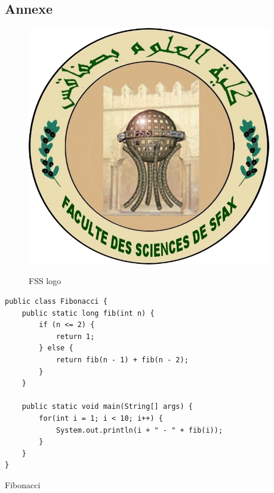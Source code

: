 \begin{appendices}
\section{Annexe}
\pagebreak

\begin{figure}[H]
    \centering
    \caption{FSS logo}
    \includegraphics[width=0.95\textwidth]{fss-old}
    \label{fig:appendixImage}
\end{figure}

\begin{listing}[ht]
    \begin{verbatim}
public class Fibonacci {
	public static long fib(int n) {
		if (n <= 2) {
			return 1;
		} else {
			return fib(n - 1) + fib(n - 2);
		}
	}

	public static void main(String[] args) {
		for(int i = 1; i < 10; i++) {
			System.out.println(i + " - " + fib(i));
		}
	}
}
    \end{verbatim}
    \caption{Fibonacci}
    \label{lst:fibAppendix}
\end{listing}

\end{appendices}
